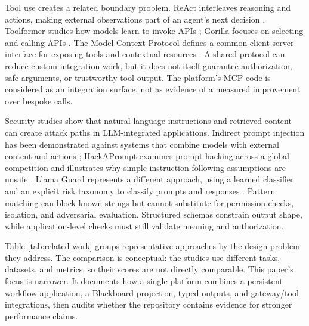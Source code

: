 \documentclass[12pt,onecolumn,draftclsnofoot]{IEEEtran}
\begin{document}
Tool use creates a related boundary problem. ReAct interleaves reasoning and actions, making external observations part of an agent's next decision \cite{yao2023react}. Toolformer studies how models learn to invoke APIs \cite{schick2023toolformer}; Gorilla focuses on selecting and calling APIs \cite{patil2023gorilla}. The Model Context Protocol defines a common client-server interface for exposing tools and contextual resources \cite{mcp2026spec}. A shared protocol can reduce custom integration work, but it does not itself guarantee authorization, safe arguments, or trustworthy tool output. The platform's MCP code is considered as an integration surface, not as evidence of a measured improvement over bespoke calls.

Security studies show that natural-language instructions and retrieved content can create attack paths in LLM-integrated applications. Indirect prompt injection has been demonstrated against systems that combine models with external content and actions \cite{greshake2023not}; HackAPrompt examines prompt hacking across a global competition and illustrates why simple instruction-following assumptions are unsafe \cite{yu2023hackaprompt}. Llama Guard represents a different approach, using a learned classifier and an explicit risk taxonomy to classify prompts and responses \cite{inan2023llama}. Pattern matching can block known strings but cannot substitute for permission checks, isolation, and adversarial evaluation. Structured schemas constrain output shape, while application-level checks must still validate meaning and authorization.

Table \ref{tab:related-work} groups representative approaches by the design problem they address. The comparison is conceptual: the studies use different tasks, datasets, and metrics, so their scores are not directly comparable. This paper's focus is narrower. It documents how a single platform combines a persistent workflow application, a Blackboard projection, typed outputs, and gateway/tool integrations, then audits whether the repository contains evidence for stronger performance claims.
\end{document}
